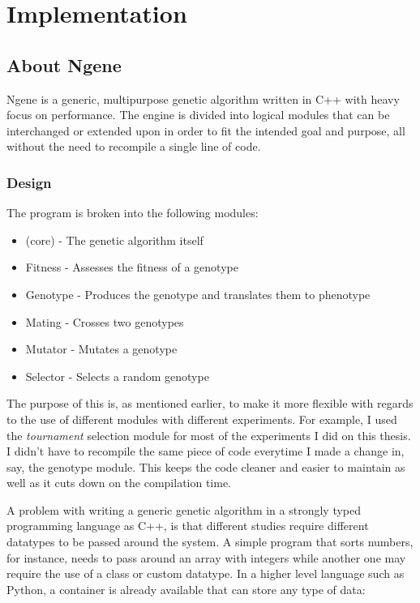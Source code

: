 \section{Implementation}

\subsection{About Ngene}
Ngene is a generic, multipurpose genetic algorithm written in C++ with heavy focus on performance. The engine is divided into logical modules that can be interchanged or extended upon in order to fit the intended goal and purpose, all without the need to recompile a single line of code.

\subsubsection{Design}
The program is broken into the following modules:

\begin{itemize}
	\item (core) - The genetic algorithm itself
	\item Fitness - Assesses the fitness of a genotype
	\item Genotype - Produces the genotype and translates them to phenotype
	\item Mating - Crosses two genotypes
	\item Mutator - Mutates a genotype
	\item Selector - Selects a random genotype
\end{itemize}

The purpose of this is, as mentioned earlier, to make it more flexible with regards to the use of different modules with different experiments. For example, I used the \emph{tournament} selection module for most of the experiments I did on this thesis. I didn't have to recompile the same piece of code everytime I made a change in, say, the genotype module. This keeps the code cleaner and easier to maintain as well as it cuts down on the compilation time.

A problem with writing a generic genetic algorithm in a strongly typed programming language as C++, is that different studies require different datatypes to be passed around the system. A simple program that sorts numbers, for instance, needs to pass around an array with integers while another one may require the use of a class or custom datatype. In a higher level language such as Python, a container is already available that can store any type of data:

